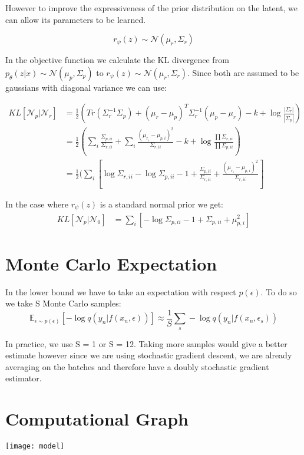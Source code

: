 \documentclass[10pt,oneside,openright]{report}
\begin{document}
However to improve the expressiveness of the prior distribution on the latent, we can allow its parameters to be learned. 

$$r_\psi(z) \sim \mathcal{N}(\mu_r, \Sigma_r)$$

In the objective function we calculate the KL divergence from $p_\theta(z|x) \sim \mathcal{N}(\mu_p, \Sigma_p)$ to $r_\psi(z) \sim \mathcal{N}(\mu_r, \Sigma_r)$. Since both are assumed to be gaussians with diagonal variance we can use:

\begin{align}
KL[\mathcal{N}_p| \mathcal{N}_r] &= \frac{1}{2}(Tr(\Sigma_r^{-1}\Sigma_p) + (\mu_r - \mu_p)^T\Sigma_r^{-1}(\mu_p - \mu_r) - k + \log\frac{|\Sigma_r|}{|\Sigma_p|})\\
&= \frac{1}{2}(\sum_i \frac{\Sigma_{p, ii}}{\Sigma_{r, ii}} + \sum_i \frac{(\mu_{r_i} - \mu_{p, i})^2}{\Sigma_{r, ii}} - k + \log\frac{\prod \Sigma_{r, ii}}{\prod \Sigma_{p, ii}})\\
&= \frac{1}{2}(\sum_i[ \log \Sigma_{r, ii} - \log \Sigma_{p, ii} - 1 + \frac{\Sigma_{p, ii}}{\Sigma_{r, ii}} + \frac{(\mu_{r_i} - \mu_{p, i})^2}{\Sigma_{r, ii}}]
\end{align}

In the case where $r_\psi(z)$ is a standard normal prior we get:
\begin{align}
KL[\mathcal{N}_p | \mathcal{N}_0] &= \sum_i[ -\log \Sigma_{p, ii} - 1 + \Sigma_{p, ii}+ \mu_{p, i}^2]
\end{align}

\section{Monte Carlo Expectation}

In the lower bound we have to take an expectation with respect $p(\epsilon)$. To do so we take S Monte Carlo samples: 
 $$ \mathbb{E}_{\epsilon \sim p(\epsilon)}[- \log q(y_{n} |f(x_{n}, \epsilon))] \approx \frac{1}{S}\sum_s - \log q(y_{n} |f(x_{n}, \epsilon_s)) $$
 
 In practice, we use S = 1 or S = 12. Taking more samples would give a better estimate however since we are using stochastic gradient descent, we are already averaging on the batches and therefore have a doubly stochastic gradient estimator.

\section{Computational Graph}
\texttt{[image: model]}
\end{document}
